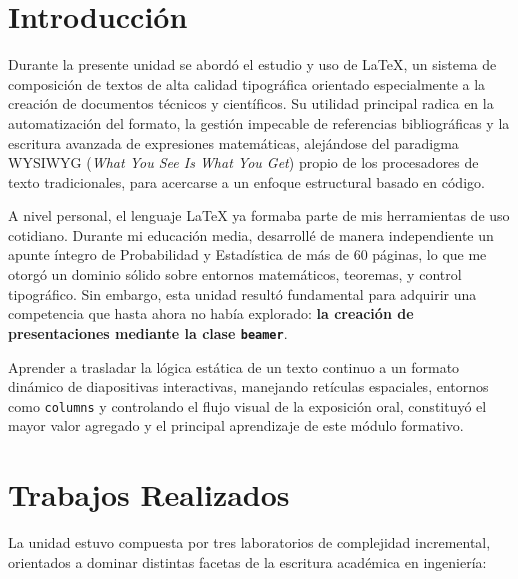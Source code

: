 \section{Introducción}

Durante la presente unidad se abordó el estudio y uso de \LaTeX, un sistema de composición de textos de alta calidad tipográfica orientado especialmente a la creación de documentos técnicos y científicos. Su utilidad principal radica en la automatización del formato, la gestión impecable de referencias bibliográficas y la escritura avanzada de expresiones matemáticas, alejándose del paradigma WYSIWYG (\textit{What You See Is What You Get}) propio de los procesadores de texto tradicionales, para acercarse a un enfoque estructural basado en código.

A nivel personal, el lenguaje \LaTeX{} ya formaba parte de mis herramientas de uso cotidiano. Durante mi educación media, desarrollé de manera independiente un apunte íntegro de Probabilidad y Estadística de más de 60 páginas, lo que me otorgó un dominio sólido sobre entornos matemáticos, teoremas, y control tipográfico. Sin embargo, esta unidad resultó fundamental para adquirir una competencia que hasta ahora no había explorado: \textbf{la creación de presentaciones mediante la clase \texttt{beamer}}.

Aprender a trasladar la lógica estática de un texto continuo a un formato dinámico de diapositivas interactivas, manejando retículas espaciales, entornos como \texttt{columns} y controlando el flujo visual de la exposición oral, constituyó el mayor valor agregado y el principal aprendizaje de este módulo formativo.

\newpage

\section{Trabajos Realizados}

La unidad estuvo compuesta por tres laboratorios de complejidad incremental, orientados a dominar distintas facetas de la escritura académica en ingeniería:


